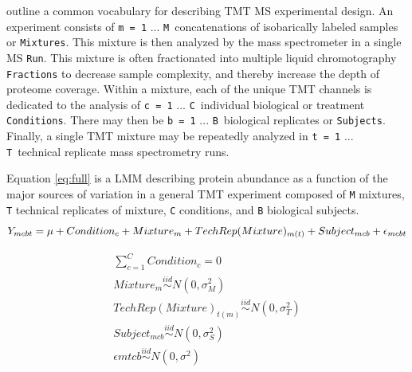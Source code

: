 \documentclass[11pt]{elife}\usepackage[]{graphicx}\usepackage[]{color}
\begin{document}
\cite{Huang2020} outline a common vocabulary for describing TMT MS experimental
design. An experiment consists of \texttt{m = 1} ...  \texttt{M}\ concatenations
of isobarically labeled samples or \texttt{Mixtures}.  This mixture is then
analyzed by the mass spectrometer in a single MS \texttt{Run}.  This mixture is
often fractionated into multiple liquid chromotography \texttt{Fractions} to
decrease sample complexity, and thereby increase the depth of proteome coverage.
Within a mixture, each of the unique TMT channels is dedicated to the analysis
of \texttt{c = 1} ...  \texttt{C}\ individual biological or treatment
\texttt{Conditions}.  There may then be \texttt{b = 1} ...  \texttt{B}\
biological replicates or \texttt{Subjects}.  Finally, a single TMT mixture may
be repeatedly analyzed in \texttt{t = 1} ...  \texttt{T}\ technical replicate
mass spectrometry runs.

Equation \ref{eq:full} is a LMM describing protein abundance as a function of
the major sources of variation  in a general TMT experiment composed of
\texttt{M} mixtures, \texttt{T} technical replicates of mixture, \texttt{C}
conditions, and \texttt{B} biological subjects.
\begin{equation} %
  \label{eq:full} 
	Y_{mcbt} = \mu + Condition_c + Mixture_m + TechRep(Mixture)_{m(t)} + 
	Subject_{mcb} + \epsilon_{mcbt}\\
\end{equation}

\begin{equation}
  \begin{gathered}
    \label{eq:constraints}
	\sum_{c=1}^{C} Condition_c = 0 \\
	Mixture_m \stackrel{iid}{\sim} N(0,\sigma^2_M) \\
	TechRep(Mixture)_{t(m)} \stackrel{iid}{\sim} N(0,\sigma^2_T) \\
	Subject_{mcb} \stackrel{iid}{\sim} N(0,\sigma^2_S) \\
	\epsilon{mtcb} \stackrel{iid}{\sim} N(0,\sigma^2) \\
  \end{gathered}
\end{equation}
\end{document}

